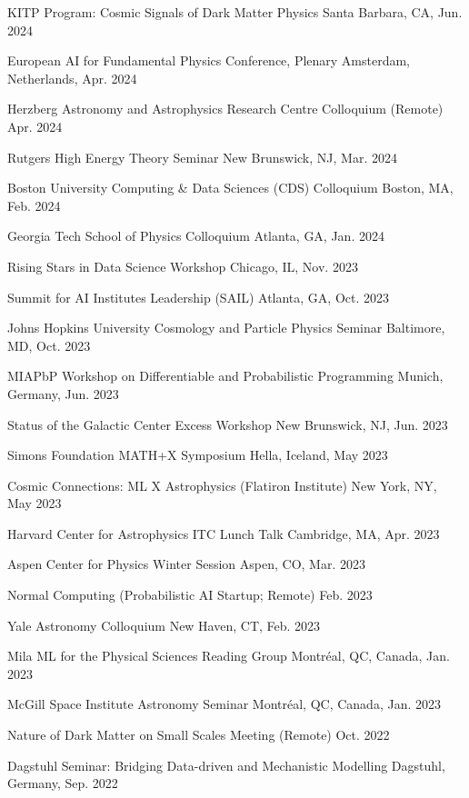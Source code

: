 \documentclass[letterpaper,11pt]{article}
\newenvironment{packed_itemize}{
\begin{itemize}[label=\raisebox{0.25ex}{\tiny$\bullet$}, topsep=0pt, partopsep=0pt]
  \setlength{\itemsep}{4.0pt}
  \setlength{\parskip}{0pt}
  \setlength{\parsep}{0pt}}{\end{itemize}
}
\begin{document}
\begin{packed_itemize}
  \item KITP Program: Cosmic Signals of Dark Matter Physics \hfill Santa Barbara, CA, Jun. 2024
  \item European AI for Fundamental Physics Conference, Plenary \hfill Amsterdam, Netherlands, Apr. 2024
  \item Herzberg Astronomy and Astrophysics Research Centre Colloquium (Remote) \hfill Apr. 2024
  \item Rutgers High Energy Theory Seminar \hfill New Brunswick, NJ, Mar. 2024
  \item Boston University Computing \& Data Sciences (CDS) Colloquium \hfill Boston, MA, Feb. 2024
  \item Georgia Tech School of Physics Colloquium \hfill Atlanta, GA, Jan. 2024
  \item Rising Stars in Data Science Workshop \hfill Chicago, IL, Nov. 2023
  \item Summit for AI Institutes Leadership (SAIL) \hfill Atlanta, GA, Oct. 2023
  \item Johns Hopkins University Cosmology and Particle Physics Seminar \hfill Baltimore, MD, Oct. 2023
  \item MIAPbP Workshop on Differentiable and Probabilistic Programming \hfill Munich, Germany, Jun. 2023
  \item Status of the Galactic Center Excess Workshop \hfill New Brunswick, NJ, Jun. 2023
  \item Simons Foundation MATH+X Symposium \hfill Hella, Iceland, May 2023
  \item Cosmic Connections: ML X Astrophysics (Flatiron Institute) \hfill New York, NY, May 2023
  \item Harvard Center for Astrophysics ITC Lunch Talk  \hfill Cambridge, MA, Apr. 2023
  \item Aspen Center for Physics Winter Session \hfill Aspen, CO, Mar. 2023
  \item Normal Computing (Probabilistic AI Startup; Remote) \hfill Feb. 2023
  \item Yale Astronomy Colloquium \hfill New Haven, CT, Feb. 2023
  \item Mila ML for the Physical Sciences Reading Group \hfill Montr\'eal, QC, Canada, Jan. 2023
  \item McGill Space Institute Astronomy Seminar \hfill Montr\'eal, QC, Canada, Jan. 2023
  \item Nature of Dark Matter on Small Scales Meeting (Remote) \hfill  Oct. 2022
  \item Dagstuhl Seminar: Bridging Data-driven and Mechanistic Modelling \hfill Dagstuhl, Germany, Sep. 2022

\end{packed_itemize}
\end{document}
